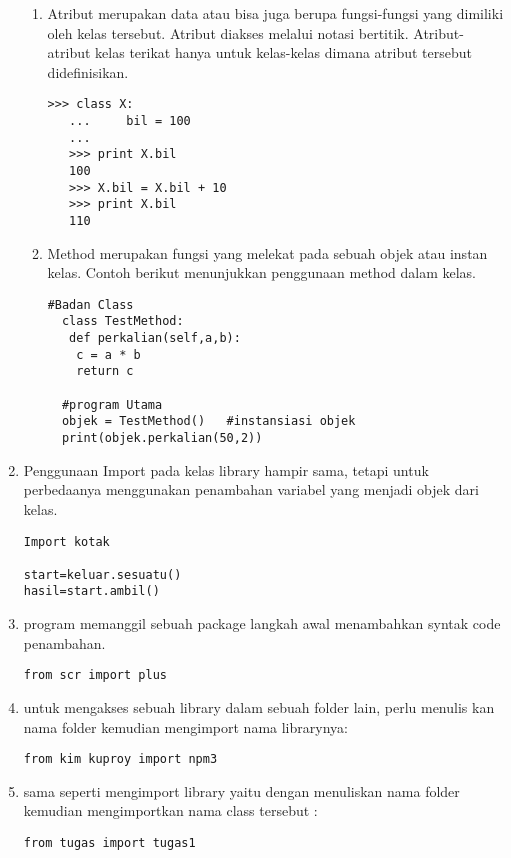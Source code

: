 \begin{enumerate}
\begin{enumerate}
\item Atribut merupakan data atau bisa juga berupa fungsi-fungsi yang dimiliki oleh kelas tersebut. Atribut diakses melalui notasi bertitik. Atribut-atribut kelas terikat hanya untuk kelas-kelas dimana atribut tersebut didefinisikan. 
\begin{lstlisting}[caption= contoh atribut, label={lst:Syntak atribut}]
  >>> class X:
   ...     bil = 100
   ...
   >>> print X.bil
   100
   >>> X.bil = X.bil + 10
   >>> print X.bil
   110
\end{lstlisting}
\item  Method merupakan fungsi yang melekat pada sebuah objek atau instan kelas. Contoh berikut menunjukkan penggunaan method dalam kelas.
\begin{lstlisting}[caption= contoh method, label={lst:Syntak method}]
#Badan Class
  class TestMethod:
   def perkalian(self,a,b):
    c = a * b
    return c
  
  #program Utama
  objek = TestMethod()   #instansiasi objek
  print(objek.perkalian(50,2))
\end{lstlisting}
\end{enumerate}
\item Penggunaan Import pada kelas library hampir sama, tetapi untuk perbedaanya menggunakan penambahan variabel yang menjadi objek dari kelas.
\begin{lstlisting}
Import kotak

start=keluar.sesuatu()
hasil=start.ambil()
\end{lstlisting} 
\item program memanggil sebuah package langkah awal menambahkan syntak code penambahan.
\begin{lstlisting}
from scr import plus
\end{lstlisting}
\item untuk mengakses sebuah library dalam sebuah folder lain, perlu menulis kan nama folder kemudian mengimport nama librarynya:
\begin{lstlisting}
from kim kuproy import npm3
\end{lstlisting}
\item sama seperti mengimport library yaitu dengan menuliskan nama folder kemudian mengimportkan nama class tersebut : 
\begin{lstlisting}
from tugas import tugas1
\end{lstlisting}
\end{enumerate}
